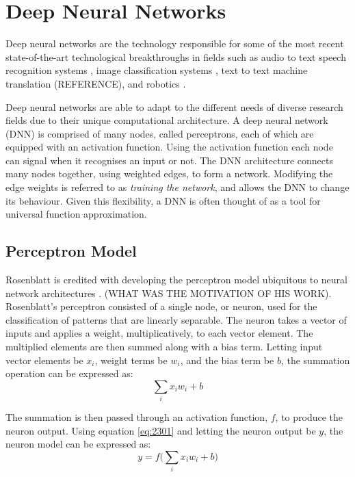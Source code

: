 \section{Deep Neural Networks}\label{dnn}
Deep neural networks are the technology responsible for some of the most recent state-of-the-art technological breakthroughs in fields such as audio to text speech recognition systems \cite{Hinton2012}, image classification systems \cite{Krizhevsky2012, Simonyan2014, Szegedy2015, He2016}, text to text machine translation (REFERENCE), and robotics \cite{Mnih2015, Lillicrap2015, Schulman2015, Schulman2015highdimensional}.

Deep neural networks are able to adapt to the different needs of diverse research fields due to their unique computational architecture. A deep neural network (DNN) is comprised of many nodes, called perceptrons, each of which are equipped with an activation function. Using the activation function each node can signal when it recognises an input or not. The DNN architecture connects many nodes together, using weighted edges, to form a network. Modifying the edge weights is referred to as \textit{training the network}, and allows the DNN to change its behaviour. Given this flexibility, a DNN is often thought of as a tool for universal function approximation.


\subsection{Perceptron Model}
Rosenblatt is credited with developing the perceptron model ubiquitous to neural network architectures \cite{Rosenblatt1958}. (WHAT WAS THE MOTIVATION OF HIS WORK). Rosenblatt's perceptron consisted of a single node, or neuron, used for the classification of patterns that are linearly separable. The neuron takes a vector of inputs and applies a weight, multiplicatively, to each vector element. The multiplied elements are then summed along with a bias term. Letting input vector elements be $x_i$, weight terms be $w_i$, and the bias term be $b$, the summation operation can be expressed as:
\begin{equation}
	\sum_{i}x_i w_i + b \label{eq:2301}
\end{equation} 

The summation is then passed through an activation function, $f$, to produce the neuron output. Using equation \ref{eq:2301} and letting the neuron output be $y$, the neuron model can be expressed as:
\begin{equation}
	y = f\bigg( \sum_{i}x_i w_i + b \bigg) \label{eq:2302}
\end{equation}

